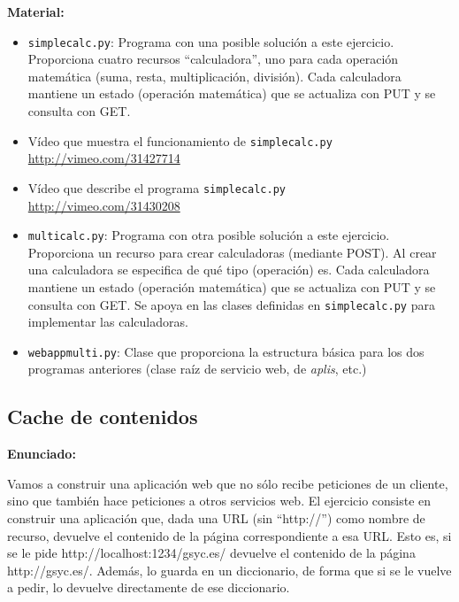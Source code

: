 \textbf{Material:}

\begin{itemize}
\item \texttt{simplecalc.py}: Programa con una posible solución a este ejercicio. Proporciona cuatro recursos ``calculadora'', uno para cada operación matemática (suma, resta, multiplicación, división). Cada calculadora mantiene un estado (operación matemática) que se actualiza con PUT y se consulta con GET.
\item Vídeo que muestra el funcionamiento de \texttt{simplecalc.py} \\
  \url{http://vimeo.com/31427714}
\item Vídeo que describe el programa \texttt{simplecalc.py} \\
  \url{http://vimeo.com/31430208}
\item \texttt{multicalc.py}: Programa con otra posible solución a este ejercicio. Proporciona un recurso para crear calculadoras (mediante POST). Al crear una calculadora se especifica de qué tipo (operación) es. Cada calculadora mantiene un estado (operación matemática) que se actualiza con PUT y se consulta con GET. Se apoya en las clases definidas en \texttt{simplecalc.py} para implementar las calculadoras.
\item \texttt{webappmulti.py}: Clase que proporciona la estructura básica para los dos programas anteriores (clase raíz de servicio web, de \emph{aplis}, etc.)
\end{itemize}


\subsection{Cache de contenidos}
\label{subsec:cache-contenidos}

\textbf{Enunciado:}

Vamos a construir una aplicación web que no sólo recibe peticiones de un cliente, sino que también hace peticiones a otros servicios web. El ejercicio consiste en construir una aplicación que, dada una URL (sin ``http://'') como nombre de recurso, devuelve el contenido de la página correspondiente a esa URL. Esto es, si se le pide http://localhost:1234/gsyc.es/ devuelve el contenido de la página http://gsyc.es/. Además, lo guarda en un diccionario, de forma que si se le vuelve a pedir, lo devuelve directamente de ese diccionario.


